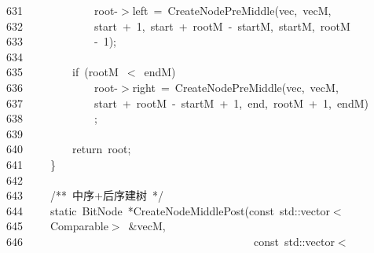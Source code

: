 \documentclass[11pt,a4paper]{ctexart}
\newcommand{\hlstd}[1]{\textcolor[rgb]{0.2,0.2,0.2}{#1}}
\newcommand{\hlnum}[1]{\textcolor[rgb]{0.06,0.58,0.63}{#1}}
\newcommand{\hlcom}[1]{\textcolor[rgb]{0.59,0.59,0.59}{#1}}
\newcommand{\hlopt}[1]{\textcolor[rgb]{0.2,0.2,0.2}{#1}}
\newcommand{\hllin}[1]{\textcolor[rgb]{0.59,0.59,0.59}{#1}}
\newcommand{\hlkwa}[1]{\textcolor[rgb]{0.23,0.42,0.78}{#1}}
\newcommand{\hlkwb}[1]{\textcolor[rgb]{0.63,0,0.31}{#1}}
\newcommand{\hlkwc}[1]{\textcolor[rgb]{0,0.63,0.31}{#1}}
\newcommand{\hlkwd}[1]{\textcolor[rgb]{0.78,0.23,0.41}{#1}}
\begin{document}
\hllin{631\ }\hlstd{}\hlstd{\ \ \ \ \ \ \ \ \ \ \ \ }\hlstd{root}\hlopt{{-}$>$}\hlstd{left\ }\hlopt{=\ }\hlstd{}\hlkwd{CreateNodePreMiddle}\hlstd{}\hlopt{(}\hlstd{vec}\hlopt{,\ }\hlstd{vecM}\hlopt{,\ }\Righttorque\\
\hllin{632\ }\hlstd{}\hlstd{\ \ \ \ \ \ \ \ \ \ \ \ }\hlstd{start\ }\hlopt{+\ }\hlstd{}\hlnum{1}\hlstd{}\hlopt{,\ }\hlstd{start\ }\hlopt{+\ }\hlstd{rootM\ }\hlopt{{-}\ }\hlstd{startM}\hlopt{,\ }\hlstd{startM}\hlopt{,\ }\hlstd{rootM\ }\Righttorque\\
\hllin{633\ }\hlstd{}\hlstd{\ \ \ \ \ \ \ \ \ \ \ \ }\hlstd{}\hlopt{{-}\ }\hlstd{}\hlnum{1}\hlstd{}\hlopt{);}\\
\hllin{634\ }\hlstd{}\\
\hllin{635\ }\hlstd{}\hlstd{\ \ \ \ \ \ \ \ }\hlstd{}\hlkwa{if\ }\hlstd{}\hlopt{(}\hlstd{rootM\ }\hlopt{$<$\ }\hlstd{endM}\hlopt{)}\\
\hllin{636\ }\hlstd{}\hlstd{\ \ \ \ \ \ \ \ \ \ \ \ }\hlstd{root}\hlopt{{-}$>$}\hlstd{right\ }\hlopt{=\ }\hlstd{}\hlkwd{CreateNodePreMiddle}\hlstd{}\hlopt{(}\hlstd{vec}\hlopt{,\ }\hlstd{vecM}\hlopt{,\ }\Righttorque\\
\hllin{637\ }\hlstd{}\hlstd{\ \ \ \ \ \ \ \ \ \ \ \ }\hlstd{start\ }\hlopt{+\ }\hlstd{rootM\ }\hlopt{{-}\ }\hlstd{startM\ }\hlopt{+\ }\hlstd{}\hlnum{1}\hlstd{}\hlopt{,\ }\hlstd{end}\hlopt{,\ }\hlstd{rootM\ }\hlopt{+\ }\hlstd{}\hlnum{1}\hlstd{}\hlopt{,\ }\hlstd{endM}\hlopt{)}\Righttorque\\
\hllin{638\ }\hlstd{}\hlstd{\ \ \ \ \ \ \ \ \ \ \ \ }\hlstd{}\hlopt{;}\\
\hllin{639\ }\hlstd{}\\
\hllin{640\ }\hlstd{}\hlstd{\ \ \ \ \ \ \ \ }\hlstd{}\hlkwa{return\ }\hlstd{root}\hlopt{;}\\
\hllin{641\ }\hlstd{}\hlstd{\ \ \ \ }\hlstd{}\hlopt{\}}\\
\hllin{642\ }\hlstd{}\\
\hllin{643\ }\hlstd{}\hlstd{\ \ \ \ }\hlstd{}\hlcom{/{*}{*}\ 中序+后序建树\ {*}/}\hlstd{}\\
\hllin{644\ }\hlstd{}\hlstd{\ \ \ \ }\hlstd{}\hlkwb{static\ }\hlstd{BitNode\ }\hlopt{{*}}\hlstd{}\hlkwd{CreateNodeMiddlePost}\hlstd{}\hlopt{(}\hlstd{}\hlkwb{const\ }\hlstd{}\hlkwc{std}\hlstd{}\hlopt{::}\hlstd{vector}\hlopt{$<$}\Righttorque\\
\hllin{645\ }\hlstd{}\hlstd{\ \ \ \ }\hlstd{Comparable}\hlopt{$>$\ \&}\hlstd{vecM}\hlopt{,}\\
\hllin{646\ }\hlstd{}\hlstd{\ \ \ \ \ \ \ \ \ \ \ \ \ \ \ \ \ \ \ \ \ \ \ \ \ \ \ \ \ \ \ \ \ \ \ \ \ \ \ \ \ }\hlstd{}\hlkwb{const\ }\hlstd{}\hlkwc{std}\hlstd{}\hlopt{::}\hlstd{vector}\hlopt{$<$}\Righttorque\\
\end{document}
